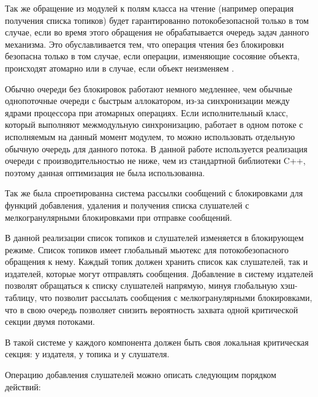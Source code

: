 Так же обращение из модулей к полям класса на чтение (например операция получения списка топиков) будет гарантированно потокобезопасной только в том случае, если во время этого обращения не обрабатывается очередь задач данного механизма. Это обуславливается тем, что операция чтения без блокировки безопасна только в том случае, если операции, изменяющие сосояние объекта, происходят атомарно  или в случае, если объект неизменяем \cite{williams2012c++}.

Обычно очереди без блокировок работают немного медленнее, чем обычные однопоточные очереди с быстрым аллокатором, из-за синхронизации между ядрами процессора при атомарных операциях. Если исполнительный класс, который выполняют межмодульную синхронизацию, работает в одном потоке с исполняемым на данный момент модулем, то можно использовать отдельную обычную очередь для данного потока. В данной работе используется реализация очереди с производительностью не ниже, чем из стандартной библиотеки C++, поэтому данная оптимизация не была использованна.

Так же была спроетированна система рассылки сообщений с блокировками для функций добавления, удаления и получения списка слушателей с мелкогранулярными блокировками при отправке сообщений.

В данной реализации список топиков и слушателей изменяется в блокирующем режиме. Список топиков имеет глобальный мьютекс для потокобезопасного обращения к нему. Каждый топик должен хранить список как слушателей, так и издателей, которые могут отправлять сообщения. Добавление в систему издателей позволят обращаться к списку слушателей напрямую, минуя глобальную хэш-таблицу, что позволит рассылать сообщения с мелкогранулярными блокировками, что в свою очередь позволяет снизить вероятность захвата одной критической секции двумя потоками.

В такой системе у каждого компонента должен быть своя локальная критическая секция: у издателя, у топика и у слушателя.

Операцию добавления слушателей можно описать следующим порядком действий:

